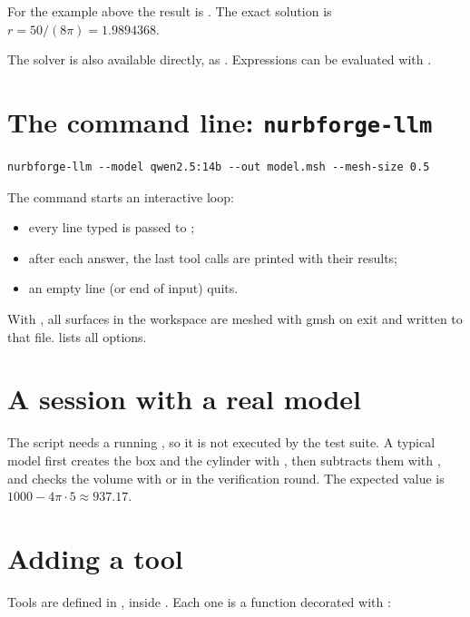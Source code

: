 {\raggedright For the example above the result is
. The exact solution is
$r = 50/(8\pi) = 1.9894368$.

The solver is also available directly, as . Expressions can be evaluated with
.\par}

\section{The command line: \texttt{nurbforge-llm}}

\begin{lstlisting}[style=shell]
nurbforge-llm --model qwen2.5:14b --out model.msh --mesh-size 0.5
\end{lstlisting}

The command starts an interactive loop:
\begin{itemize}
  \item every line typed is passed to ;
  \item after each answer, the last tool calls are printed with their results;
  \item an empty line (or end of input) quits.
\end{itemize}
With , all surfaces in the workspace are meshed with gmsh on exit and written to
that file.  lists all options.

\section{A session with a real model}


The script needs a running , so it is not executed by the test suite. A
typical model first creates the box and the cylinder with , then subtracts them
with , and checks the volume with  or in the verification
round. The expected value is $1000-4\pi\cdot5\approx937.17$.

\section{Adding a tool}

Tools are defined in , inside . Each
one is a function decorated with :

